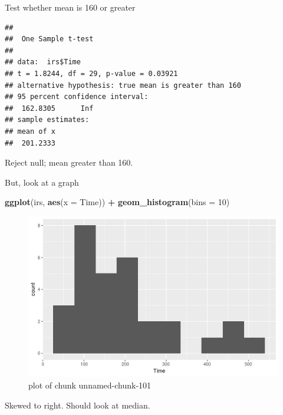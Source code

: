 \documentclass[ignorenonframetext,]{beamer}
\newenvironment{Shaded}{\begin{snugshade}}{\end{snugshade}}
\newcommand{\DataTypeTok}[1]{\textcolor[rgb]{0.13,0.29,0.53}{#1}}
\newcommand{\DecValTok}[1]{\textcolor[rgb]{0.00,0.00,0.81}{#1}}
\newcommand{\KeywordTok}[1]{\textcolor[rgb]{0.13,0.29,0.53}{\textbf{#1}}}
\newcommand{\NormalTok}[1]{#1}
\newcommand{\OperatorTok}[1]{\textcolor[rgb]{0.81,0.36,0.00}{\textbf{#1}}}
\newcommand{\StringTok}[1]{\textcolor[rgb]{0.31,0.60,0.02}{#1}}
\begin{document}
\begin{frame}[fragile]{Test whether mean is 160 or greater}
\protect\hypertarget{test-whether-mean-is-160-or-greater}{}

\begin{Shaded}
\end{Shaded}

\begin{verbatim}
## 
##  One Sample t-test
## 
## data:  irs$Time
## t = 1.8244, df = 29, p-value = 0.03921
## alternative hypothesis: true mean is greater than 160
## 95 percent confidence interval:
##  162.8305      Inf
## sample estimates:
## mean of x 
##  201.2333
\end{verbatim}

Reject null; mean greater than 160.

\end{frame}

\begin{frame}[fragile]{But, look at a graph}
\protect\hypertarget{but-look-at-a-graph}{}

\begin{Shaded}
\begin{Highlighting}[]
\KeywordTok{ggplot}\NormalTok{(irs, }\KeywordTok{aes}\NormalTok{(}\DataTypeTok{x =}\NormalTok{ Time)) }\OperatorTok{+}\StringTok{ }\KeywordTok{geom_histogram}\NormalTok{(}\DataTypeTok{bins =} \DecValTok{10}\NormalTok{)}
\end{Highlighting}
\end{Shaded}

\begin{figure}
\centering
\includegraphics{figure/unnamed-chunk-101-1.png}
\caption{plot of chunk unnamed-chunk-101}
\end{figure}

Skewed to right. Should look at median.

\end{frame}
\end{document}

